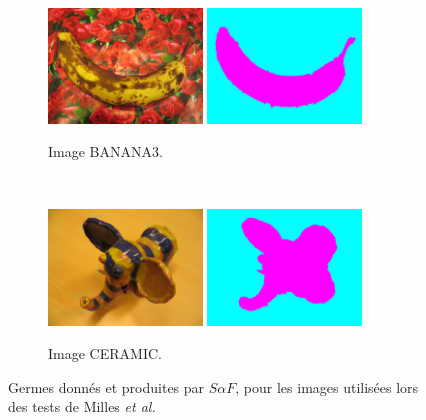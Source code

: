 \begin{figure}[htb]
	\\	
	 \begin{subfigure}[B]{0.7\textwidth}	
			\includegraphics[width=0.45\textwidth]{images/evaluation/Milles/banana3_seeds.jpg}
			\includegraphics[width=0.45\textwidth]{images/evaluation/Milles/banana3_seg.png}
		 \caption{Image BANANA3.}
	\end{subfigure}		
	\\
	 \begin{subfigure}[B]{0.7\textwidth}	
			\includegraphics[width=0.45\textwidth]{images/evaluation/Milles/ceramic_seeds.jpg}
			\includegraphics[width=0.45\textwidth]{images/evaluation/Milles/ceramic_seg.png}
		 \caption{Image CERAMIC.}
	\end{subfigure}	
	\caption{Germes donnés et  produites par $S \alpha F$, pour les images utilisées lors des tests de Milles \textit{et al.}}
	\label{fig:eval:BinC1}
\end{figure}

